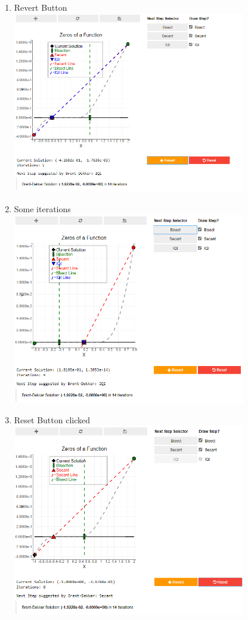 \begin{enumerate}
    \item Revert Button\\
    \includegraphics[width=0.8\textwidth]{Include/Images/Thesis/Documentation/Visualizers/NonLinear/Example 2/Example 2 - 03 - Revert Button.png}
    \item Some iterations\\
    \includegraphics[width=0.8\textwidth]{Include/Images/Thesis/Documentation/Visualizers/NonLinear/Example 2/Example 2 - 04 - Some Iterations.png}
    \item Reset Button clicked\\
    \includegraphics[width=0.8\textwidth]{Include/Images/Thesis/Documentation/Visualizers/NonLinear/Example 2/Example 2 - 04 - Reset Button.png}

\end{enumerate}
